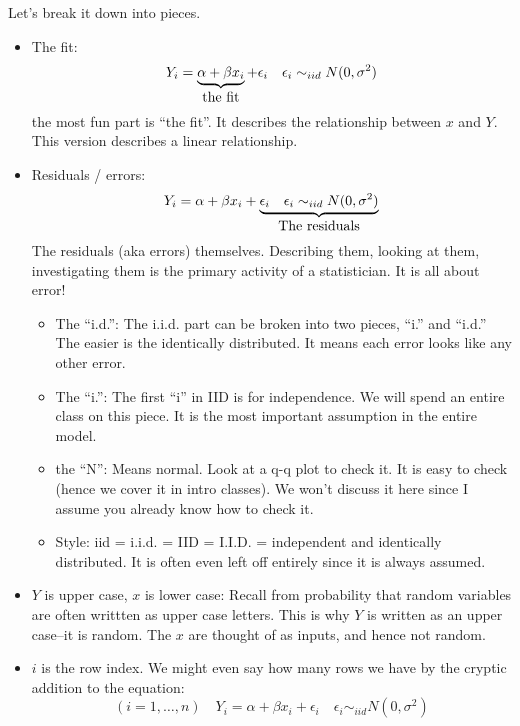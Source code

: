 \documentclass{article}
\begin{document}
Let's break it down into pieces.
\begin{itemize}
\item The fit:
\begin{displaymath}
Y_i = \underbrace{\alpha + \beta x_i}_{\hbox{the fit}} + \epsilon_i \quad \epsilon_i \sim_{iid}
N(0,\sigma^2)
\end{displaymath}
the most fun part is ``the fit''.  It describes the relationship
between $x$ and $Y$.  This version describes a linear relationship. 

\item Residuals / errors:
\begin{displaymath}
Y_i = \alpha + \beta x_i + \underbrace{\epsilon_i \quad \epsilon_i
\sim_{iid} N(0,\sigma^2)}_{\hbox{The residuals}}
\end{displaymath}
The residuals (aka errors) themselves.  Describing them,
looking at them, investigating them is the primary activity of a
statistician.  It is all about error!
\begin{itemize}
\item The ``i.d.'':  The i.i.d. part can be broken into two pieces, ``i.''
and ``i.d.''  The easier is the identically distributed.  It means
each error looks like any other error.

\item The ``i.'': The first ``i'' in IID is for independence.  We will
spend an entire class on this piece.  It is the most important
assumption in the entire model.

\item the ``N'': Means normal.  Look at a q-q plot to check it.  It is
easy to check (hence we cover it in intro classes).  We won't discuss
it here since I assume you already know how to check it.

\item Style: iid = i.i.d. = IID = I.I.D. = independent and identically
distributed.  It is often even left off entirely since it is always
assumed. 
\end{itemize}

\item $Y$ is upper case, $x$ is lower case: Recall from probability that
random variables are often writtten as upper case letters.  This is
why $Y$ is written as an upper case--it is random.  The $x$ are
thought of as inputs, and hence not random.

\item $i$ is the row index.  We might even say how many rows we have
by the cryptic addition to the equation:
\begin{displaymath}
(i = 1,\ldots,n) \quad
Y_i = \alpha + \beta x_i + \epsilon_i \quad \epsilon_i \sim_{iid}
N(0,\sigma^2)
\end{displaymath}


\end{itemize}
\end{document}
